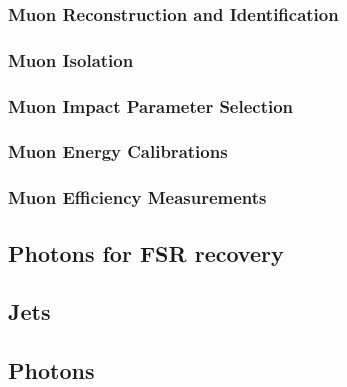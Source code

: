 \subsubsection{Muon Reconstruction and Identification}
\label{sec:muonReco}

\subsubsection{Muon Isolation}
\label{sec:muoniso}

 \subsubsection{Muon Impact Parameter Selection}
 \label{sec:muSIP}
 
\subsubsection{Muon Energy Calibrations}

\subsubsection{Muon Efficiency Measurements}
\label{sec:muonEffMeas}

%
\subsection{Photons for FSR recovery}
\label{sec:FSRphotons}

\subsection{Jets}


\subsection{Photons}
\label{sec:photons}

